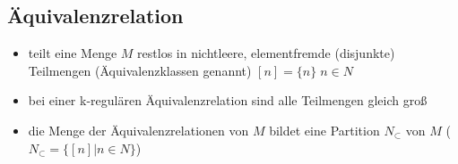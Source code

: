 \subsection{Äquivalenzrelation}
\begin{itemize}
\item teilt eine Menge $M$ restlos in nichtleere, elementfremde
  (disjunkte) Teilmengen (Äquivalenzklassen genannt)
  $[n] = \{n\} \; n \in N$
\item bei einer k-regulären Äquivalenzrelation sind alle Teilmengen
  gleich groß
\item die Menge der Äquivalenzrelationen von $M$ bildet eine Partition $N_{\subset}$
  von $M$ ($N_{\subset} = \{ [n] | n \in N\}$)
\end{itemize}



